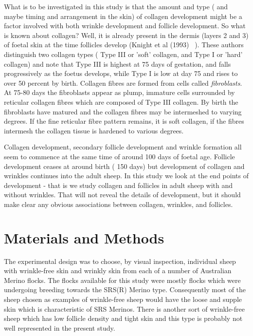 \documentclass[titlepage]{article}  %
\begin{document}
What is to be investigated in this study is that the amount and type ( and maybe timing and arrangement in the skin) of collagen development might be a factor involved with both wrinkle development and follicle development. So what is known about collagen? Well, it is already present in the dermis (layers 2 and 3) of foetal skin at the time follicles develop (Knight et al (1993) ~\cite{knig:93}). 
 These authors distinguish two collagen types ( Type III or 'soft' collagen, and Type I or 'hard' collagen) and note  that Type III is highest at 75 days of gestation, and falls progressively as the foetus develops, while Type I is low at day 75 and rises to over 50 percent by birth. Collagen fibres are formed from cells called {\em fibroblasts}. At 75-80 days the fibroblasts appear as plump, immature cells surrounded by reticular collagen fibres which are composed of Type III collagen. By birth the fibroblasts have matured  and the collagen fibres may be intermeshed to varying degrees. If the fine reticular fibre pattern remains, it is soft collagen, if the fibres intermesh the collagen tissue is hardened to various degrees. 

Collagen development, secondary follicle development and wrinkle formation  all seem to commence at the same time of around 100 days of foetal age.  Follicle development ceases at around birth ( 150 days) but development of collagen and wrinkles continues into the adult sheep. In this study we look at the end points of development - that is we study collagen and follicles in adult sheep with and without wrinkles. That will not reveal the details of development, but it should make clear any obvious associations between collagen, wrinkles, and follicles.

\section{Materials and Methods}
The experimental design was to choose, by visual inspection, individual sheep with wrinkle-free skin and wrinkly skin from each of a number of Australian Merino flocks. The flocks available for this study were mostly flocks which were undergoing breeding towards the SRS(R) Merino type. Consequently most of the sheep chosen as examples of wrinkle-free sheep would have the loose and supple skin which is characteristic of SRS Merinos. There is another sort of wrinkle-free sheep which has low follicle density and tight skin and this type is probably not well represented in the present study.
\end{document}
